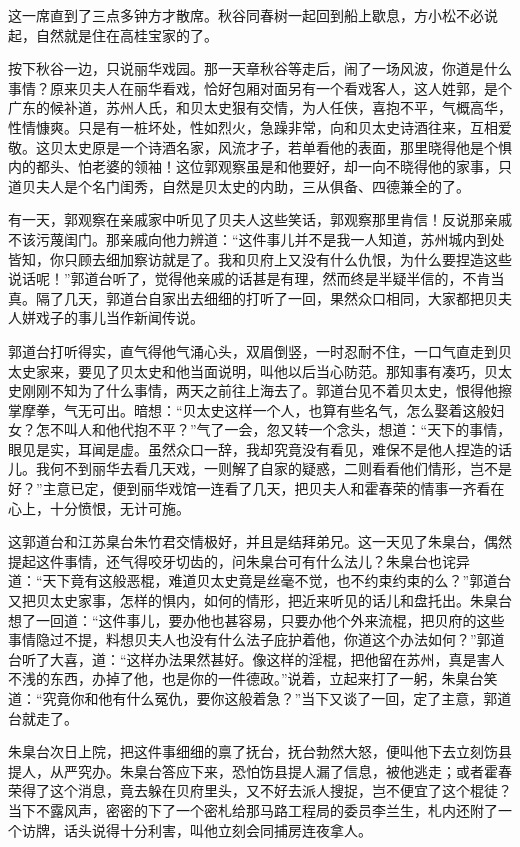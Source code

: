 \documentclass[12pt,UTF8]{ctexbook}
\begin{document}
{{{这一席直到了三点多钟方才散席。秋谷同春树一起回到船上歇息，方小松不必说起，自然就是住在高桂宝家的了。

按下秋谷一边，只说丽华戏园。那一天章秋谷等走后，闹了一场风波，你道是什么事情？原来贝夫人在丽华看戏，恰好包厢对面另有一个看戏客人，这人姓郭，是个广东的候补道，苏州人氏，和贝太史狠有交情，为人任侠，喜抱不平，气概高华，性情慷爽。只是有一桩坏处，性如烈火，急躁非常，向和贝太史诗酒往来，互相爱敬。这贝太史原是一个诗酒名家，风流才子，若单看他的表面，那里晓得他是个惧内的都头、怕老婆的领袖！这位郭观察虽是和他要好，却一向不晓得他的家事，只道贝夫人是个名门闺秀，自然是贝太史的内助，三从俱备、四德兼全的了。

有一天，郭观察在亲戚家中听见了贝夫人这些笑话，郭观察那里肯信！反说那亲戚不该污蔑闺门。那亲戚向他力辨道：“这件事儿并不是我一人知道，苏州城内到处皆知，你只顾去细加察访就是了。我和贝府上又没有什么仇恨，为什么要捏造这些说话呢！”郭道台听了，觉得他亲戚的话甚是有理，然而终是半疑半信的，不肯当真。隔了几天，郭道台自家出去细细的打听了一回，果然众口相同，大家都把贝夫人姘戏子的事儿当作新闻传说。

郭道台打听得实，直气得他气涌心头，双眉倒竖，一时忍耐不住，一口气直走到贝太史家来，要见了贝太史和他当面说明，叫他以后当心防范。那知事有凑巧，贝太史刚刚不知为了什么事情，两天之前往上海去了。郭道台见不着贝太史，恨得他擦掌摩拳，气无可出。暗想：“贝太史这样一个人，也算有些名气，怎么娶着这般妇女？怎不叫人和他代抱不平？”气了一会，忽又转一个念头，想道：“天下的事情，眼见是实，耳闻是虚。虽然众口一辞，我却究竟没有看见，难保不是他人捏造的话儿。我何不到丽华去看几天戏，一则解了自家的疑惑，二则看看他们情形，岂不是好？”主意已定，便到丽华戏馆一连看了几天，把贝夫人和霍春荣的情事一齐看在心上，十分愤恨，无计可施。

这郭道台和江苏臬台朱竹君交情极好，并且是结拜弟兄。这一天见了朱臬台，偶然提起这件事情，还气得咬牙切齿的，问朱臬台可有什么法儿？朱臬台也诧异道：“天下竟有这般恶棍，难道贝太史竟是丝毫不觉，也不约束约束的么？”郭道台又把贝太史家事，怎样的惧内，如何的情形，把近来听见的话儿和盘托出。朱臬台想了一回道：“这件事儿，要办他也甚容易，只要办他个外来流棍，把贝府的这些事情隐过不提，料想贝夫人也没有什么法子庇护着他，你道这个办法如何？”郭道台听了大喜，道：“这样办法果然甚好。像这样的淫棍，把他留在苏州，真是害人不浅的东西，办掉了他，也是你的一件德政。”说着，立起来打了一躬，朱臬台笑道：“究竟你和他有什么冤仇，要你这般着急？”当下又谈了一回，定了主意，郭道台就走了。

朱臬台次日上院，把这件事细细的禀了抚台，抚台勃然大怒，便叫他下去立刻饬县提人，从严究办。朱臬台答应下来，恐怕饬县提人漏了信息，被他逃走；或者霍春荣得了这个消息，竟去躲在贝府里头，又不好去派人搜捉，岂不便宜了这个棍徒？当下不露风声，密密的下了一个密札给那马路工程局的委员李兰生，札内还附了一个访牌，话头说得十分利害，叫他立刻会同捕房连夜拿人。

}}}
\end{document}
